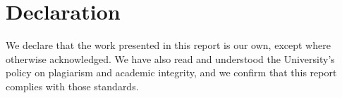 \section*{Declaration}
We declare that the work presented in this report is our own, except where otherwise acknowledged. We have also read and understood the University's policy on plagiarism and academic integrity, and we confirm that this report complies with those standards.